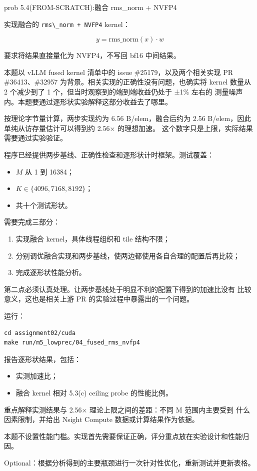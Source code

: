 \documentclass[11pt,a4paper,fontset=none]{ctexart}
\providecommand{\tightlist}{\setlength{\itemsep}{0pt}\setlength{\parskip}{0pt}}
\providecommand{\passthrough}[1]{#1}
\begin{document}
\begin{capstone}{prob 5.4(FROM-SCRATCH):融合 rms\_norm + NVFP4}

实现融合的 \passthrough{\lstinline!rms\_norm + NVFP4!} kernel：

\[
y = \mathrm{rms\_norm}(x)\cdot w
\]

要求将结果直接量化为 NVFP4，不写回 bf16 中间结果。

本题以 vLLM fused kernel 清单中的 issue \#25179，以及两个相关实现 PR
\#36413、\#32957 为背景。相关实现的正确性没有问题，也确实将 kernel
数量从 2 个减少到了 1 个，但当时观察到的端到端收益仍处于 ±1\% 左右的
测量噪声内。本题要通过逐形状实验解释这部分收益去了哪里。

按理论字节量计算，两步实现约为 6.56 B/elem，融合后约为 2.56
B/elem，因此单纯从访存量估计可以得到约 2.56× 的理想加速。
这个数字只是上限，实际结果需要通过实验验证。

程序已经提供两步基线、正确性检查和逐形状计时框架。测试覆盖：

\begin{itemize}
\tightlist
\item
  \(M\) 从 1 到 16384；
\item
  \(K \in \{4096, 7168, 8192\}\)；
\item
  共十个测试形状。
\end{itemize}

需要完成三部分：

\begin{enumerate}
\def\labelenumi{\arabic{enumi}.}
\tightlist
\item
  实现融合 kernel，具体线程组织和 tile 结构不限；
\item
  分别调优融合实现和两步基线，使两边都使用各自合理的配置后再比较；
\item
  完成逐形状性能分析。
\end{enumerate}

第二点必须认真处理。让两步基线处于明显不利的配置下得到的加速比没有
比较意义，这也是相关上游 PR 的实验过程中暴露出的一个问题。

运行：

\begin{lstlisting}
cd assignment02/cuda
make run/m5_lowprec/04_fused_rms_nvfp4
\end{lstlisting}

报告逐形状结果，包括：

\begin{itemize}
\tightlist
\item
  实测加速比；
\item
  融合 kernel 相对 5.3(c) ceiling probe 的性能比例。
\end{itemize}

重点解释实测结果与 2.56× 理论上限之间的差距：不同 M 范围内主要受到
什么因素限制，并给出 Nsight Compute 数据或计算结果作为依据。

本题不设置性能门槛。实现首先需要保证正确，评分重点放在实验设计和性能归因。

Optional：根据分析得到的主要瓶颈进行一次针对性优化，重新测试并更新表格。

\end{capstone}
\end{document}
